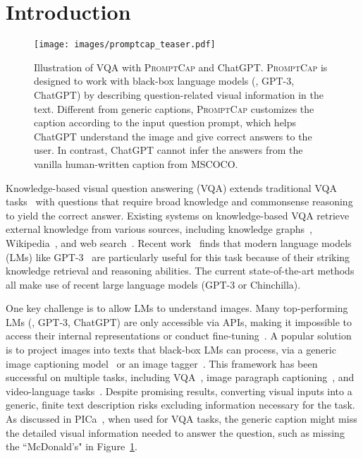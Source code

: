 \documentclass[10pt,twocolumn,letterpaper]{article}
\newcommand{\NAME}{\textsc{PromptCap}\xspace}
\begin{document}
\section{Introduction}
\label{sec:intro}

\begin{figure}[ht]
\centering
  \texttt{[image: images/promptcap\_teaser.pdf]}
  \caption{
  Illustration of VQA with \NAME and ChatGPT.
  \NAME is designed to work with black-box language models (\eg, GPT-3, ChatGPT) by describing question-related visual information in the text. Different from generic captions, \NAME customizes the caption according to the input question prompt, which helps ChatGPT understand the image and give correct answers to the user. In contrast, ChatGPT cannot infer the answers from the vanilla human-written caption from MSCOCO. 
}
  \vspace{-5mm}
  \label{fig:teaser}
\end{figure}

Knowledge-based visual question answering (VQA) \cite{marino2019ok} extends traditional VQA tasks~\cite{antol2015vqa} with questions that require broad knowledge and commonsense reasoning to yield the correct answer. 
Existing systems on knowledge-based VQA retrieve external knowledge from various sources, including knowledge graphs~\cite{garderes2020conceptbert, marino2021krisp, wu2022multi}, Wikipedia~\cite{marino2021krisp, wu2022multi, Gao_2022_CVPR, gui2022kat, Lin2022REVIVERV}, and web search~\cite{luo2021weakly, wu2022multi}. 
Recent work~\cite{yang2022empirical} finds that modern language models (LMs) like GPT-3~\cite{brown2020language} are particularly useful for this task because of their striking knowledge retrieval and reasoning abilities. The current state-of-the-art methods~\cite{yang2022empirical, gui2022kat, Lin2022REVIVERV, alayrac2022flamingo} all make use of recent large language models (GPT-3 or Chinchilla).

One key challenge is to allow LMs to understand images. 
Many top-performing LMs (\eg, GPT-3, ChatGPT) are only accessible via APIs, making it impossible to access their internal representations or conduct fine-tuning~\cite{Shi2023REPLUGRB}. A popular solution is to project images into texts that black-box LMs can process, via a generic image captioning model~\cite{chen2015microsoft} or an image tagger~\cite{yang2022empirical}. This framework has been successful on multiple tasks, including VQA~\cite{yang2022empirical, gui2022kat, Lin2022REVIVERV}, image paragraph captioning~\cite{xie2022visual}, and video-language tasks~\cite{zeng2022socratic,wang2022language}. 
Despite promising results, converting visual inputs into a generic, finite text description risks excluding information necessary for the task. As discussed in PICa~\cite{yang2022empirical}, when used for VQA tasks, the generic caption might miss the detailed visual information needed to answer the question, such as missing the ``McDonald's" in Figure~\ref{fig:teaser}.
\end{document}
